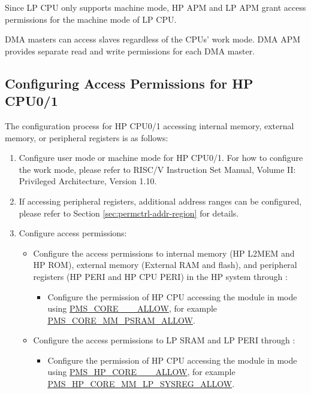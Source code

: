 \documentclass[main\_\_EN.tex]{subfiles}
\begin{document}
Since LP CPU only supports machine mode, HP APM and LP APM grant access permissions for the machine mode of LP CPU.

DMA masters can access slaves regardless of the CPUs' work mode. DMA APM provides separate read and write permissions for each DMA master.

\subsection{Configuring Access Permissions for HP CPU0/1}

The configuration process for HP CPU0/1 accessing internal memory, external memory, or peripheral registers is as follows:

\begin{enumerate}
    \item Configure user mode or machine mode for HP CPU0/1. For how to configure the work mode, please refer to RISC\-/V Instruction Set Manual, Volume II: Privileged Architecture, Version 1.10.
    \item If accessing peripheral registers,  additional address ranges can be configured, please refer to Section \ref{sec:permctrl-addr-region} for details.
    \item Configure access permissions:
    \begin{itemize}
        \item Configure the access permissions to internal memory (HP L2MEM and HP ROM), external memory (External RAM and flash), and peripheral registers (HP PERI and HP CPU PERI) in the HP system through :
        \begin{itemize}
            \item Configure the permission of HP CPU accessing the  module in  mode using \hyperref[fielddesc:PMSCORENMML2ROMALLOW]{PMS\_CORE\_\_\_ALLOW}, for example \hyperref[fielddesc:PMSCORENMMPSRAMALLOW]{PMS\_CORE\_MM\_PSRAM\_ALLOW}.
        \end{itemize}
        \item Configure the access permissions to LP SRAM and LP PERI through :
        \begin{itemize}
            \item Configure the permission of HP CPU accessing the  module in  mode using \hyperref[fielddesc:PMSHPCORENMMLPSYSREGALLOW]{PMS\_HP\_CORE\_\_\_ALLOW}, for example \hyperref[fielddesc:PMSHPCORENMMLPSYSREGALLOW]{PMS\_HP\_CORE\_MM\_LP\_SYSREG\_ALLOW}.
        \end{itemize}
    \end{itemize}
\end{enumerate}
\end{document}
